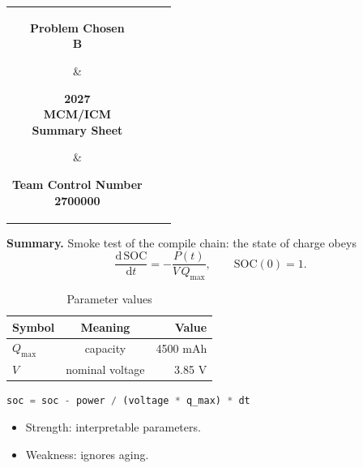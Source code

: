 \documentclass[12pt,letterpaper]{article}
\begin{document}
\begin{center}
\begin{tabular}{*3{c}}
  \parbox[t]{0.3\linewidth}{\centering\textbf{Problem Chosen}\\{\Large\textbf{B}}}
  & \parbox[t]{0.3\linewidth}{\centering\textbf{2027\\MCM/ICM\\Summary Sheet}}
  & \parbox[t]{0.3\linewidth}{\centering\textbf{Team Control Number}\\{\Large\textbf{2700000}}}\\
  \hline
\end{tabular}
\end{center}

\noindent\textbf{Summary.} Smoke test of the compile chain: the state of charge obeys
\begin{equation}
  \frac{\mathrm{d}\,\mathrm{SOC}}{\mathrm{d}t} = -\frac{P(t)}{V\,Q_{\max}}, \qquad
  \mathrm{SOC}(0)=1 .
\end{equation}

\begin{table}[H]
\centering
\caption{Parameter values}
\begin{tabular}{lcr}
\toprule
Symbol & Meaning & Value \\
\midrule
$Q_{\max}$ & capacity & 4500 mAh \\
$V$ & nominal voltage & 3.85 V \\
\bottomrule
\end{tabular}
\end{table}

\begin{lstlisting}[language=Python]
soc = soc - power / (voltage * q_max) * dt
\end{lstlisting}

\begin{itemize}[nosep]
  \item Strength: interpretable parameters.
  \item Weakness: ignores aging.
\end{itemize}
\label{MathmodelSolutionEnd}
\end{document}

